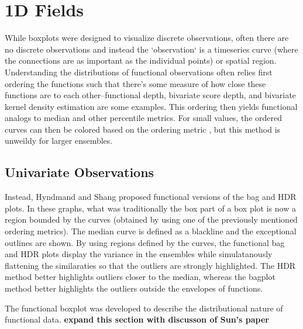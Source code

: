 \documentclass[../main.tex]{subfiles}
\begin{document}
\section{1D Fields}
While boxplots were designed to visualize discrete observations, often there
are no discrete observations and instead the `observation` is a timeseries
curve (where the connections are as important as the individual points) or
spatial region. Understanding the distributions of functional observations
often relies first ordering the functions such that there's some measure of how
close these functions are to each other--functional depth\cite{febrero2007},
bivariate score depth\cite{hyndman2009}, and
bivariate kernel density estimation\cite{scott1992} are some examples. This
ordering then yields functional analogs to median and other percentile
metrics. For small values, the ordered curves can then be colored based on the
ordering metric \cite{hyndman2009}, but this method is unweildy for larger
ensembles.

\subsection{Univariate Observations}

\begin{figure}
  \label{fig:funcbag}
\end{figure}
Instead, Hyndmand and Shang proposed functional versions of the bag and HDR
plots\cite{hyndman2009}. In these graphs,
what was traditionally the box part of a box plot is now a region bounded by
the curves (obtained by using one of the previously mentioned ordering
metrics). The median curve is defined as a blackline and the exceptional
outlines are shown. By using regions defined by the curves, the functional bag
and HDR plots display the variance in the ensembles while simulatanously
flattening the similaraties so that the outliers are strongly highlighted. The
HDR method better highlights outliers closer to the median, whereas the bagplot
method better highlights the outliers outside the envelopes of functions.



The functional boxplot was developed to describe the distributional nature of
functional data\cite{sun2011}. \textbf{expand this section with discusson of
  Sun's paper}
\end{document}
